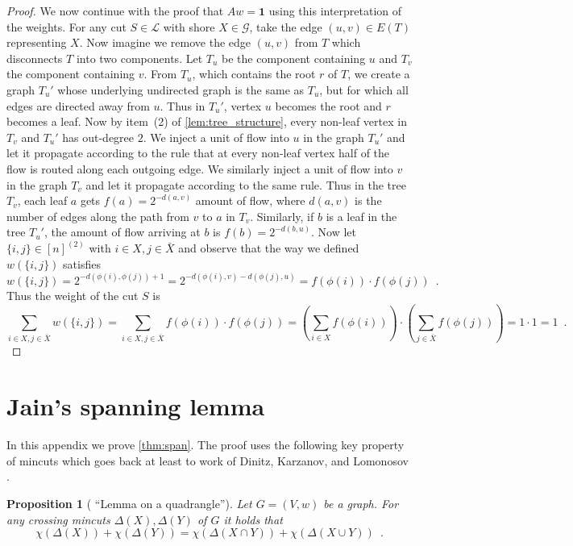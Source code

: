 \documentclass[10pt,a4paper]{article}
\newcommand{\Lcal}{\mathcal{L}}
\newcommand{\Gcal}{\mathcal{G}}
\newcommand{\1}{\mathbf{1}}
\newtheorem{proposition}[theorem]{Proposition}
\theoremstyle{definition}
\begin{document}
\begin{proof}
We now continue with the proof that $Aw = \1$ using this interpretation of the weights.  For any cut $S\in \Lcal$ with shore $X \in \Gcal$, take the edge $(u,v) \in E(T)$ representing $X$.
Now imagine we remove the edge $(u,v)$ from $T$ which disconnects $T$ into two components.  Let $T_u$ be the component containing $u$ and $T_v$ the component containing $v$.
From $T_u$, which contains the root $r$ of $T$, we create a graph $T_u'$ whose underlying undirected graph is the same as $T_u$, but for which all edges are directed away from $u$.  Thus in
$T_u'$, vertex $u$ becomes the root and $r$ becomes a leaf.  Now by item~(2) of \cref{lem:tree_structure}, every non-leaf vertex in $T_v$ and $T_u'$ has out-degree $2$.  We inject a unit of flow into $u$ in the graph $T_u'$
and let it propagate according to the rule that at every non-leaf vertex half of the flow is routed along each outgoing edge.  We similarly inject a unit of flow into $v$ in the graph $T_v$ and let it
propagate according to the same rule.  Thus in the tree $T_v$, each leaf $a$ gets $f(a) = 2^{-d(a,v)}$ amount of flow, where $d(a,v)$ is the number of edges along the path from $v$ to $a$ in $T_v$.
Similarly, if $b$ is a leaf in the tree $T_u'$, the amount of flow arriving at $b$ is $f(b) = 2^{-d(b,u)}$. Now let $\{i,j\} \in [n]^{(2)}$ with $i \in X, j \in \bar{X}$ and observe that the way we defined $w(\{i,j\})$ satisfies
 \[
 w(\{i,j\}) = 2^{-d(\phi(i),\phi(j))+1}  = 2^{-d(\phi(i),v) - d(\phi(j),u)} = f(\phi(i))\cdot  f(\phi(j)) \enspace.
 \]
 Thus the weight of the cut $S$ is
 \[
 \sum_{i\in X,j\in \bar{X}} w(\{i,j\}) =  \sum_{i\in X,j\in \bar{X}} f(\phi(i)) \cdot f(\phi(j)) =  \left(\sum_{i\in X} f(\phi(i))\right) \cdot \left(\sum_{j\in \bar{X}} f(\phi(j))\right) = 1\cdot 1 = 1 \enspace .
 \]

\end{proof}

%


\appendix\setcounter{theorem}{44}\section{Jain's spanning lemma}
\label{sec:appendix}
In this appendix we prove \cref{thm:span}.  The proof uses the following key property of mincuts which goes back at least
to work of Dinitz, Karzanov, and Lomonosov \cite{DKL76}.

\begin{proposition}[\cite{DKL76} ``Lemma on a quadrangle'']
\label{prop:bixby}
Let $G = (V,w)$ be a graph.
For any crossing mincuts $\Delta(X), \Delta(Y)$ of $G$
it holds that
\[
\chi(\Delta(X)) + \chi(\Delta(Y)) = \chi(\Delta(X \cap Y)) + \chi(\Delta(X \cup Y)) \enspace .
\]
\end{proposition}
\end{document}
